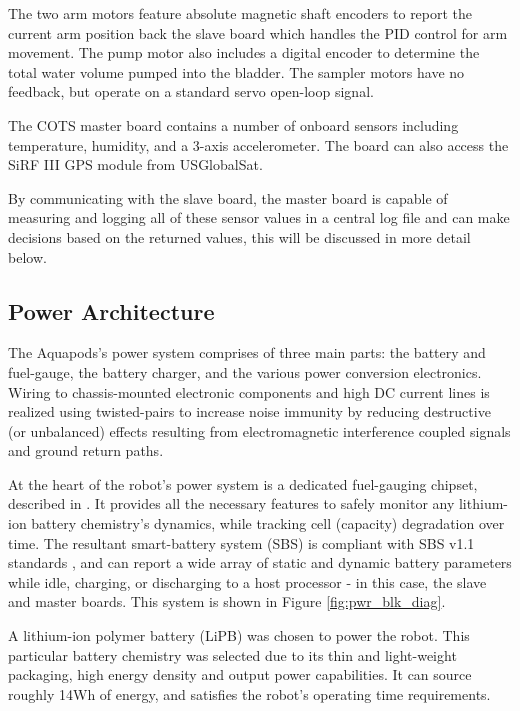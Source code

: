 The two arm motors feature absolute magnetic shaft encoders to report the current arm position back the slave board which handles the PID control for arm movement. The pump motor also includes a digital encoder to determine the total water volume pumped into the bladder. The sampler motors have no feedback, but operate on a standard servo open-loop signal.

The COTS master board contains a number of onboard sensors including temperature, humidity, and a 3-axis accelerometer. The board can also access the SiRF III GPS module from USGlobalSat.

By communicating with the slave board, the master board is capable of measuring and logging all of these sensor values in a central log file and can make decisions based on the returned values, this will be discussed in more detail below.
\subsection{Power Architecture}
The Aquapods's power system comprises of three main parts: the battery and fuel-gauge, the battery charger, and the various power conversion electronics.  Wiring to chassis-mounted electronic components and high DC current lines is realized using twisted-pairs to increase noise immunity by reducing destructive (or unbalanced) effects resulting from electromagnetic interference coupled signals and ground return paths.

At the heart of the robot's power system is a dedicated fuel-gauging chipset, described in \cite{Kottas2009}.  It provides all the necessary features to safely monitor any lithium-ion battery chemistry's dynamics, while tracking cell (capacity) degradation over time.  The resultant smart-battery system (SBS) is compliant with SBS v1.1 standards \cite{sbs_std}, and can report a wide array of static and dynamic battery parameters while idle, charging, or discharging to a host processor - in this case, the slave and master boards. This system is shown in Figure \ref{fig:pwr_blk_diag}.

A lithium-ion polymer battery (LiPB) was chosen to power the robot.  This particular battery chemistry was selected due to its thin and light-weight packaging, high energy density and output power capabilities.  It can source roughly 14Wh of energy, and satisfies the robot's operating time requirements. 

